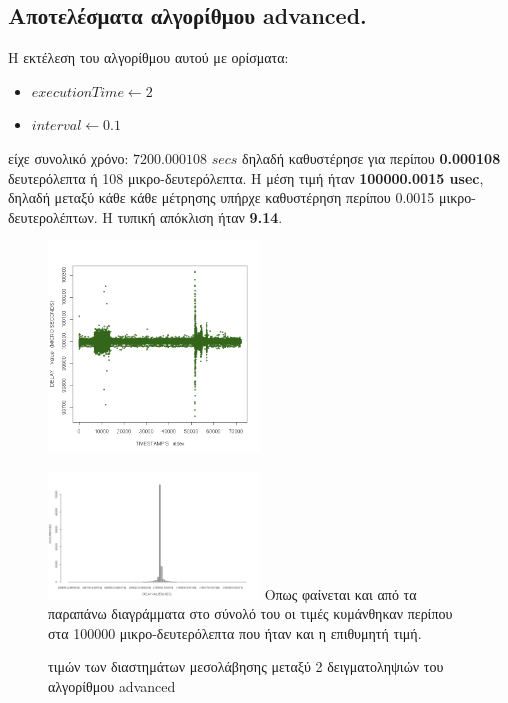 \documentclass[12pt, a4paper]{article}
\begin{document}
\subsection{Αποτελέσματα αλγορίθμου \textlatin{advanced}.}
\justify
Η εκτέλεση του αλγορίθμου αυτού με ορίσματα:
\begin{itemize}
    \item $executionTime \longleftarrow 2$
    \item $interval \longleftarrow 0.1$
\end{itemize}
είχε συνολικό χρόνο: $7200.000108$ $secs$ δηλαδή καθυστέρησε για περίπου \textbf{0.000108} δευτερόλεπτα ή 108 μικρο-δευτερόλεπτα. Η μέση τιμή ήταν \textbf{100000.0015 \textlatin{usec}}, δηλαδή μεταξύ κάθε κάθε μέτρησης υπήρχε καθυστέρηση περίπου 0.0015 μικρο-δευτερολέπτων. Η τυπική απόκλιση ήταν \textbf{9.14}.
\begin{figure}[h]
\caption{}
\centering
\includegraphics[width=0.5\textwidth]{images/advanced.png}
\end{figure}

\begin{figure}[h]
 \caption{ τιμών των διαστημάτων μεσολάβησης μεταξύ 2 δειγματοληψιών του αλγορίθμου \textlatin{advanced}}
\centering
\includegraphics[width=0.5\textwidth]{images/advanced_distribution.png}
\justify
Οπως φαίνεται και από τα παραπάνω διαγράμματα στο σύνολό του οι τιμές κυμάνθηκαν περίπου στα 100000 μικρο-δευτερόλεπτα που ήταν και η επιθυμητή τιμή.
\end{figure}
\end{document}
